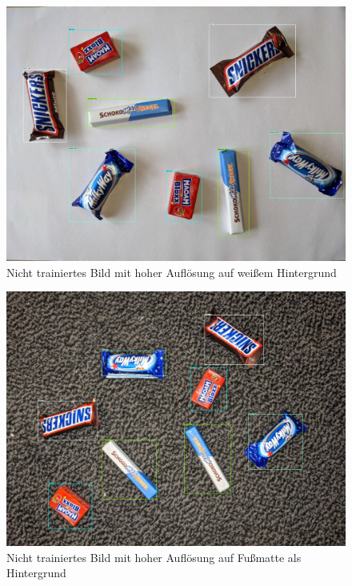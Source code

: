     \begin{figure}[H]
        \centering
        \includegraphics[angle = 90, width = \textwidth]{Bilder/models/model_comparison/faster_rcnn_inception_resnet_v2_640x640_coco17_tpu-8/HD_on_white.jpg}
        \caption{Nicht trainiertes Bild mit hoher Auflösung auf weißem Hintergrund}
    \end{figure}
    
    \begin{figure}[H]
        \centering
        \includegraphics[angle = 90, width = \textwidth]{Bilder/models/model_comparison/faster_rcnn_inception_resnet_v2_640x640_coco17_tpu-8/HD_on_doormat.jpg}
        \caption{Nicht trainiertes Bild mit hoher Auflösung auf Fußmatte als Hintergrund}
    \end{figure}
    
